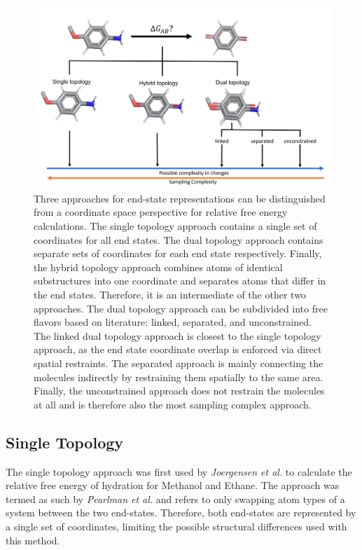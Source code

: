 \begin{figure}[h!]
    \centering
    \includegraphics[width=\linewidth]{fig/theory/landscape_of_simulationApproaches.png}
    \caption{Three approaches for end-state representations can be distinguished from a coordinate space perspective for relative free energy calculations. The single topology approach contains a single set of coordinates for all end states. The dual topology approach contains separate sets of coordinates for each end state respectively. Finally, the hybrid topology approach combines atoms of identical substructures into one coordinate and separates atoms that differ in the end states. Therefore, it is an intermediate of the other two approaches. The dual topology approach can be subdivided into free flavors based on literature: linked, separated, and unconstrained. The linked dual topology approach is closest to the single topology approach, as the end state coordinate overlap is enforced via direct spatial restraints. The separated approach is mainly connecting the molecules indirectly by restraining them spatially to the same area. Finally, the unconstrained approach does not restrain the molecules at all and is therefore also the most sampling complex approach.}
    \label{fig:Topology Types}
\end{figure}

\subsection{Single Topology}
The single topology approach was first used by \textit{Joergensen et al.} to calculate the relative free energy of hydration for Methanol and Ethane. The approach was termed as such by \textit{Pearlman et al.} and refers to only swapping atom types of a system between the two end-states. \cite{Jorgensen1985, Pearlman1991, Pohorille2010, Jespers2019}
Therefore, both end-states are represented by a single set of coordinates, limiting the possible structural differences used with this method.

